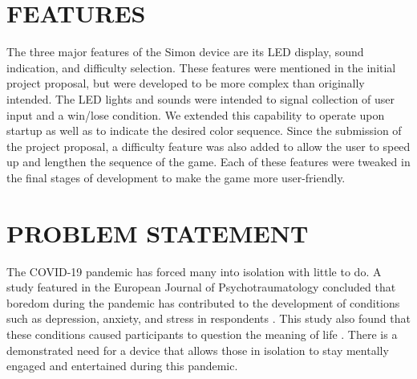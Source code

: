 \documentclass[12pt]{article}
\begin{document}
\section{FEATURES} %

The three major features of the Simon device are its LED display, sound indication, and difficulty selection. These features were mentioned in the initial project proposal, but were developed to be more complex than originally intended. The LED lights and sounds were intended to signal collection of user input and a win/lose condition. We extended this capability to operate upon startup as well as to indicate the desired color sequence. Since the submission of the project proposal, a difficulty feature was also added to allow the user to speed up and lengthen the sequence of the game. Each of these features were tweaked in the final stages of development to make the game more user-friendly.

\section{PROBLEM STATEMENT} %

The COVID-19 pandemic has forced many into isolation with little to do. A study featured in the European Journal of Psychotraumatology concluded that boredom during the pandemic has contributed to the development of conditions such as depression, anxiety, and stress in respondents \cite{Chao}. This study also found that these conditions caused participants to question the meaning of life \cite{Chao}. There is a demonstrated need for a device that allows those in isolation to stay mentally engaged and entertained during this pandemic.
\end{document}
